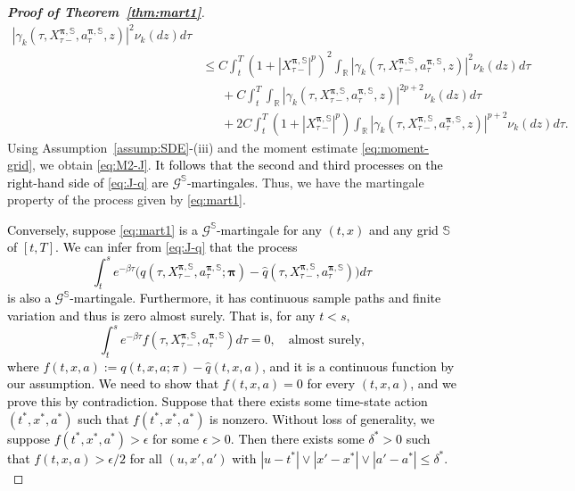 \documentclass[11pt]{article}
\newcommand{\1}{\mathbbm{1}}
\newcommand{\rev}[1]{\textcolor{black}{{#1}}} %
\begin{document}
\begin{proof}[\bf Proof of Theorem~\ref{thm:mart1}]
{\begin{align}
	|{\gamma}_k( \tau, X^{\boldsymbol{\pi}, \mathbb{S}}_{\tau-} , a_\tau^{\boldsymbol{\pi}, \mathbb{S}}, z)|^2 \nu_k(dz) d\tau\\
	&\leq C\int_t^T (1+|X^{\boldsymbol{\pi}, \mathbb{S}}_{\tau-}|^p)^2\int_{\mathbb{R}}|{\gamma}_k( \tau, X^{\boldsymbol{\pi}, \mathbb{S}}_{\tau-} , a_\tau^{\boldsymbol{\pi}, \mathbb{S}}, z)|^2 \nu_k(dz)d\tau\\
	&\phantom{\leq~} + C\int_t^T\int_{\mathbb{R}}|{\gamma}_k( \tau, X^{\boldsymbol{\pi}, \mathbb{S}}_{\tau-} , a_\tau^{\boldsymbol{\pi}, \mathbb{S}}, z)|^{2p+2} \nu_k(dz)d\tau \\
	&\phantom{\leq~} + 2C \int_t^T(1+ |X^{\boldsymbol{\pi}, \mathbb{S}}_{\tau-}|^p)\int_{\mathbb{R}}|{\gamma}_k( \tau, X^{\boldsymbol{\pi}, \mathbb{S}}_{\tau-} , a_\tau^{\boldsymbol{\pi}, \mathbb{S}}, z)|^{p+2} \nu_k(dz)d\tau.
\end{align}
Using Assumption~\ref{assump:SDE}-(iii) and the moment estimate \eqref{eq:moment-grid}, we obtain \eqref{eq:M2-J}.  \rev{It follows that the second and third processes on the right-hand side of \eqref{eq:J-q} are $\mathcal{G}^{\mathbb{S}}$-martingales.}
Thus, we have the martingale property of the process given by \eqref{eq:mart1}.
}

\rev{
Conversely, suppose \eqref{eq:mart1} is a $\mathcal{G}^{\mathbb{S}}$-martingale for any $(t,x)$ and any grid $\mathbb{S}$ of $[t,T]$.
We can infer from \eqref{eq:J-q} that the process
\begin{equation}
\int_t^s e^{-\beta \tau}   \big(  q(\tau,  X_{\tau-}^{\boldsymbol{\pi}, \mathbb{S}}, a_\tau^{\boldsymbol{\pi}, \mathbb{S}}; \boldsymbol{\pi}) -  \hat  q(\tau,  X_{\tau-}^{\boldsymbol{\pi}, \mathbb{S}}, a_\tau^{\boldsymbol{\pi}, \mathbb{S}}) \big)  d\tau	
\end{equation}
is also a $\mathcal{G}^{\mathbb{S}}$-martingale. Furthermore, it has continuous sample paths and finite variation and thus is zero almost surely. That is, for any $t<s,$
\begin{equation}\label{eq:f-zero}
\int_t^s e^{-\beta \tau}   f(\tau,  X_{\tau-}^{\boldsymbol{\pi}, \mathbb{S}}, a_\tau^{\boldsymbol{\pi}, \mathbb{S}})  d\tau =0, \quad \text{almost surely,}	
\end{equation}
where $f(t,x,a) := q(t,x,a; \pi) - \hat q(t,x,a)$, and it is a continuous function by our assumption.
We need to show that $f(t,x,a)=0$ for every $(t,x,a)$, and we prove this by contradiction. Suppose that there exists some time-state action $(t^*, x^*, a^*)$ such that $f(t^*, x^*, a^*)$ is nonzero. Without loss of generality, we suppose $f(t^*, x^*, a^*)> \epsilon$ for some $\epsilon>0.$ Then there exists some $\delta^*>0$ such that $f(t, x, a)> \epsilon/2$ for
all $(u, x', a')$ with $ |u - t^*| \vee | x'-x^*| \vee |a' -a^*| \le \delta^*$.
}



\end{proof}
\end{document}
